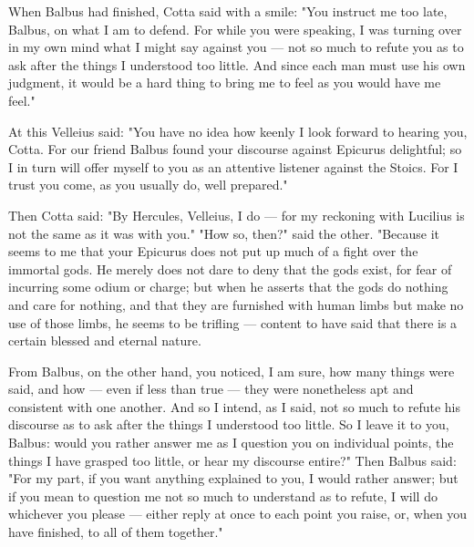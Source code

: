 
 When Balbus had finished, Cotta said with a smile: "You instruct me too late, Balbus, on what I am to defend. For while you were speaking, I was turning over in my own mind what I might say against you — not so much to refute you as to ask after the things I understood too little. And since each man must use his own judgment, it would be a hard thing to bring me to feel as you would have me feel."

 At this Velleius said: "You have no idea how keenly I look forward to hearing you, Cotta. For our friend Balbus found your discourse against Epicurus delightful; so I in turn will offer myself to you as an attentive listener against the Stoics. For I trust you come, as you usually do, well prepared."

 Then Cotta said: "By Hercules, Velleius, I do — for my reckoning with Lucilius is not the same as it was with you." "How so, then?" said the other. "Because it seems to me that your Epicurus does not put up much of a fight over the immortal gods. He merely does not dare to deny that the gods exist, for fear of incurring some odium or charge; but when he asserts that the gods do nothing and care for nothing, and that they are furnished with human limbs but make no use of those limbs, he seems to be trifling — content to have said that there is a certain blessed and eternal nature.

 From Balbus, on the other hand, you noticed, I am sure, how many things were said, and how — even if less than true — they were nonetheless apt and consistent with one another. And so I intend, as I said, not so much to refute his discourse as to ask after the things I understood too little. So I leave it to you, Balbus: would you rather answer me as I question you on individual points, the things I have grasped too little, or hear my discourse entire?" Then Balbus said: "For my part, if you want anything explained to you, I would rather answer; but if you mean to question me not so much to understand as to refute, I will do whichever you please — either reply at once to each point you raise, or, when you have finished, to all of them together."

